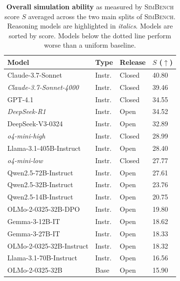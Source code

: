 \documentclass{article} %
\begin{document}
\begin{table}
    \caption{\textbf{Overall simulation ability} as measured by \textsc{SimBench} score $S$ averaged across the two main splits of \textsc{SimBench}.
    Reasoning models are highlighted in \textit{italics}.
    Models are sorted by score.
    Models below the dotted line perform worse than a uniform baseline.
    }
    \label{tab:total_variation_main_expanded}
    \renewcommand{\arraystretch}{1.15}
    \small
    \centering
    \begin{tabular}{llll}
        \toprule
        \textbf{Model} & \textbf{Type} & \textbf{Release} & \textbf{$S$ ($\uparrow$)} \\
        \midrule
        \rowcolor[HTML]{EFEFEF}
        Claude-3.7-Sonnet & Instr. & Closed & 40.80 \\
        \textit{Claude-3.7-Sonnet-4000} & Instr. & Closed & 39.46 \\
        \rowcolor[HTML]{EFEFEF}
        GPT-4.1 & Instr. & Closed & 34.55 \\
        \textit{DeepSeek-R1} & Instr. & Open & 34.52 \\
        \rowcolor[HTML]{EFEFEF}
        DeepSeek-V3-0324 & Instr. & Open & 32.89 \\
        \textit{o4-mini-high} & Instr. & Closed & 28.99 \\
        \rowcolor[HTML]{EFEFEF}
        Llama-3.1-405B-Instruct & Instr. & Open & 28.40 \\
        \textit{o4-mini-low} & Instr. & Closed & 27.77 \\
        \rowcolor[HTML]{EFEFEF}
        Qwen2.5-72B-Instruct & Instr. & Open & 27.61 \\
        Qwen2.5-32B-Instruct & Instr. & Open & 23.76 \\
        \rowcolor[HTML]{EFEFEF}
        Qwen2.5-14B-Instruct & Instr. & Open & 20.75 \\
        OLMo-2-0325-32B-DPO & Instr. & Open & 19.80 \\
        \rowcolor[HTML]{EFEFEF}
        Gemma-3-12B-IT & Instr. & Open & 18.62 \\
        Gemma-3-27B-IT & Instr. & Open & 18.33 \\
        \rowcolor[HTML]{EFEFEF}
        OLMo-2-0325-32B-Instruct & Instr. & Open & 18.32 \\
        Llama-3.1-70B-Instruct & Instr. & Open & 16.56 \\
        \rowcolor[HTML]{EFEFEF}
        OLMo-2-0325-32B & Base & Open & 15.90 \\

\end{tabular}
\end{table}
\end{document}
